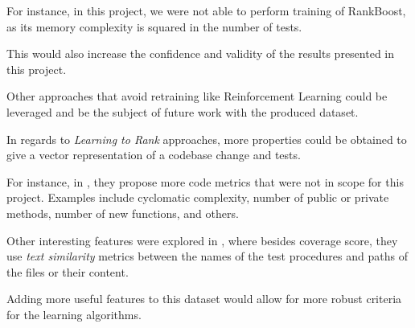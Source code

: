 For instance, in this project, we were not able
to perform training of RankBoost, as its memory complexity is squared in the
number of tests.

This would also increase the confidence and validity of the results presented in this 
project.

Other approaches that avoid retraining like Reinforcement Learning could be 
leveraged and be the subject of future work with the produced dataset.


In regards to \emph{Learning to Rank} approaches, more properties could be
obtained to give a vector representation of a codebase change and tests. 

For instance, in \cite{Bertolino2020LearningtoRankVR}, they propose more 
code metrics that were not in scope for this project. Examples include 
cyclomatic complexity, number of public or private methods, number of 
new functions, and others. 

Other interesting features were explored in \cite{Busjaeger2016LearningFT}, 
where besides coverage score, they use \emph{text similarity} metrics between the 
names of the test procedures and paths of the files or their content. 

Adding more useful features to this dataset would allow for more
robust criteria for the learning algorithms.